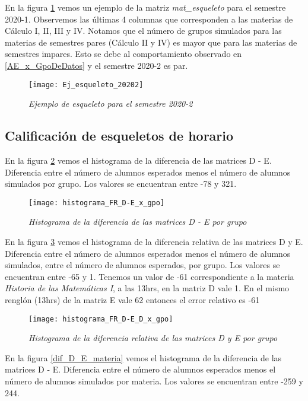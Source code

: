 En la figura \ref{esqueleto20202} vemos un ejemplo de la matriz \textit{mat\_esqueleto} para el semestre 2020-1. Observemos las últimas 4 columnas que corresponden a las materias de Cálculo I, II, III y IV. Notamos que el número de grupos simulados para las materias de semestres pares (Cálculo II y IV) es mayor que para las materias de semestres impares. Esto se debe al comportamiento observado en \ref{AE_x_GpoDeDatos} y el semestre 2020-2 es par.

\begin{figure}[H]
\centering
\texttt{[image: Ej\_esqueleto\_20202]} %
\caption{\textit{Ejemplo de esqueleto para el semestre 2020-2}}\label{esqueleto20202}
\end{figure}

\subsection{Calificación de esqueletos de horario}

En la figura \ref{dif_D_E_gpo} vemos el histograma de la diferencia de las matrices D - E. Diferencia entre el número de alumnos esperados menos el número de alumnos simulados por grupo. Los valores se encuentran entre -78 y 321.

\begin{figure}[H]
\centering
\texttt{[image: histograma\_FR\_D-E\_x\_gpo]} %
\caption{\textit{Histograma de la diferencia de las matrices D - E por grupo}}\label{dif_D_E_gpo}
\end{figure}


En la figura \ref{difRel_D_E_gpo} vemos el histograma de la diferencia relativa de las matrices D y E. Diferencia entre el número de alumnos esperados menos el número de alumnos simulados, entre el número de alumnos esperados, por grupo. Los valores se encuentran entre -65 y 1. Tenemos un valor de -61 correspondiente a la materia \textit{Historia de las Matemáticas I}, a las 13hrs, en la matriz D vale 1. En el mismo renglón (13hrs) de la matriz E vale 62 entonces el error relativo es -61

\begin{figure}[H]
\centering
\texttt{[image: histograma\_FR\_D-E\_D\_x\_gpo]} %
\caption{\textit{Histograma de la diferencia relativa de las matrices D y E por grupo}}\label{difRel_D_E_gpo}
\end{figure}


En la figura \ref{dif_D_E_materia} vemos el histograma de la diferencia de las matrices D - E. Diferencia entre el número de alumnos esperados menos el número de alumnos simulados por materia. Los valores se encuentran entre -259 y 244.

